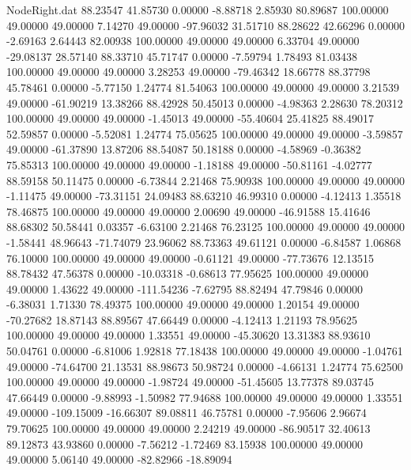 \begin{filecontents}{NodeRight.dat}
  88.23547   41.85730    0.00000    -8.88718    2.85930   80.89687  100.00000   49.00000   49.00000    7.14270   49.00000  -97.96032   31.51710
  88.28622   42.66296    0.00000    -2.69163    2.64443   82.00938  100.00000   49.00000   49.00000    6.33704   49.00000  -29.08137   28.57140
  88.33710   45.71747    0.00000    -7.59794    1.78493   81.03438  100.00000   49.00000   49.00000    3.28253   49.00000  -79.46342   18.66778
  88.37798   45.78461    0.00000    -5.77150    1.24774   81.54063  100.00000   49.00000   49.00000    3.21539   49.00000  -61.90219   13.38266
  88.42928   50.45013    0.00000    -4.98363    2.28630   78.20312  100.00000   49.00000   49.00000   -1.45013   49.00000  -55.40604   25.41825
  88.49017   52.59857    0.00000    -5.52081    1.24774   75.05625  100.00000   49.00000   49.00000   -3.59857   49.00000  -61.37890   13.87206
  88.54087   50.18188    0.00000    -4.58969   -0.36382   75.85313  100.00000   49.00000   49.00000   -1.18188   49.00000  -50.81161   -4.02777
  88.59158   50.11475    0.00000    -6.73844    2.21468   75.90938  100.00000   49.00000   49.00000   -1.11475   49.00000  -73.31151   24.09483
  88.63210   46.99310    0.00000    -4.12413    1.35518   78.46875  100.00000   49.00000   49.00000    2.00690   49.00000  -46.91588   15.41646
  88.68302   50.58441    0.03357    -6.63100    2.21468   76.23125  100.00000   49.00000   49.00000   -1.58441   48.96643  -71.74079   23.96062
  88.73363   49.61121    0.00000    -6.84587    1.06868   76.10000  100.00000   49.00000   49.00000   -0.61121   49.00000  -77.73676   12.13515
  88.78432   47.56378    0.00000   -10.03318   -0.68613   77.95625  100.00000   49.00000   49.00000    1.43622   49.00000 -111.54236   -7.62795
  88.82494   47.79846    0.00000    -6.38031    1.71330   78.49375  100.00000   49.00000   49.00000    1.20154   49.00000  -70.27682   18.87143
  88.89567   47.66449    0.00000    -4.12413    1.21193   78.95625  100.00000   49.00000   49.00000    1.33551   49.00000  -45.30620   13.31383
  88.93610   50.04761    0.00000    -6.81006    1.92818   77.18438  100.00000   49.00000   49.00000   -1.04761   49.00000  -74.64700   21.13531
  88.98673   50.98724    0.00000    -4.66131    1.24774   75.62500  100.00000   49.00000   49.00000   -1.98724   49.00000  -51.45605   13.77378
  89.03745   47.66449    0.00000    -9.88993   -1.50982   77.94688  100.00000   49.00000   49.00000    1.33551   49.00000 -109.15009  -16.66307
  89.08811   46.75781    0.00000    -7.95606    2.96674   79.70625  100.00000   49.00000   49.00000    2.24219   49.00000  -86.90517   32.40613
  89.12873   43.93860    0.00000    -7.56212   -1.72469   83.15938  100.00000   49.00000   49.00000    5.06140   49.00000  -82.82966  -18.89094

\end{filecontents}
